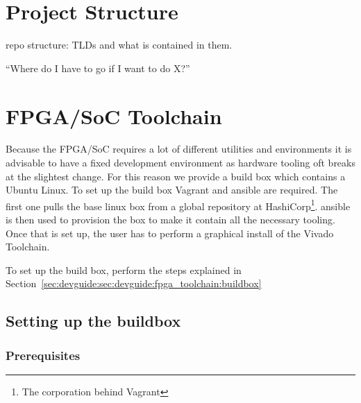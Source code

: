 %
%
\chapter{Project Structure} %
\label{ch:devguide:project_structure}

repo structure: TLDs and what is contained in them.

``Where do I have to go if I want to do X?''

%
%
\chapter{FPGA/SoC Toolchain} %
\label{ch:devguide:fpga_toolchain}

Because the FPGA/SoC requires a lot of different utilities and environments it
is advisable to  have a fixed development environment as  hardware tooling oft
breaks at the slightest change.
For this reason we  provide a build box which contains  a Ubuntu Linux. To set
up the build box Vagrant and ansible are required.
The first one pulls the base linux box from a global repository at HashiCorp\footnote{The corporation behind Vagrant}. ansible is then used to provision the box to make it contain all the necessary tooling. Once that is set up, the user has to perform a graphical install of the Vivado Toolchain.

To   set    up   the   build    box,   perform   the   steps    explained   in
Section~\ref{sec:devguide:sec:devguide:fpga_toolchain:buildbox}

\section{Setting up the buildbox}
\label{sec:devguide:fpga_toolchain:buildbox}

\subsection*{Prerequisites}

